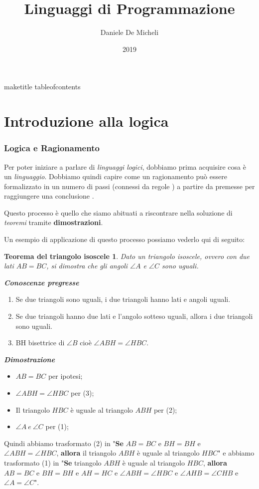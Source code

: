 \documentclass[11pt]{article}
\title{Linguaggi di Programmazione}
\author{Daniele De Micheli}
\date{2019}
\newtheorem*{isoscele}{Teorema del triangolo isoscele}
\begin{document}
maketitle
tableofcontents

\part{Introduzione alla logica}
\section{Logica e Ragionamento}
Per poter iniziare a parlare di \textit{linguaggi logici}, dobbiamo prima acquisire cosa è un \textit{linguaggio}.
Dobbiamo quindi capire come un \color{red} ragionamento \color{black} può essere \color{red} formalizzato \color{black} in un numero di \color{red} passi \color{black} (connessi da \color{red} regole \color{black}) a partire da \color{red} premesse \color{black} per raggiungere una \color{red} conclusione \color{black}. 

Questo processo è quello che siamo abituati a riscontrare nella soluzione di \textit{teoremi} tramite \textbf{dimostrazioni}.

Un esempio di applicazione di questo processo possiamo vederlo qui di seguito: 

\begin{isoscele}
Dato un triangolo isoscele, ovvero con due lati $AB = BC$, si dimostra che gli angoli $\angle A$ e $\angle C$ sono uguali.
\end{isoscele}

\textit{\textbf{Conoscenze pregresse}}
\begin{enumerate}
	\item Se due triangoli sono uguali, i due triangoli hanno lati e angoli uguali.
	\item Se due triangoli hanno due lati e l'angolo sotteso uguali, allora i due triangoli sono uguali.
	\item BH bisettrice di $\angle B$ cioè $\angle ABH = \angle HBC$.
\end{enumerate}

\textit{\textbf{Dimostrazione}}
\begin{itemize}
	\item $AB = BC$ per ipotesi;
	\item $\angle ABH = \angle HBC$ per (3);
	\item Il triangolo $HBC$ è uguale al triangolo $ABH$ per (2);
	\item $\angle A \medspace e \medspace \angle C$ per (1); 
\end{itemize}
Quindi abbiamo trasformato (2) in "\textbf{Se} $AB = BC$ e $BH = BH$ e $\angle ABH = \angle HBC$, \textbf{allora} il triangolo $ABH $ è uguale al triangolo $HBC$" e abbiamo trasformato (1) in "\textbf{Se} triangolo $ABH$ è uguale al triangolo $HBC$, \textbf{allora} $AB = BC $ e $ BH = BH $ e $AH = HC $ e $\angle ABH = \angle HBC $ e $\angle AHB = \angle CHB$ e $\angle A = \angle C$".
\end{document}
